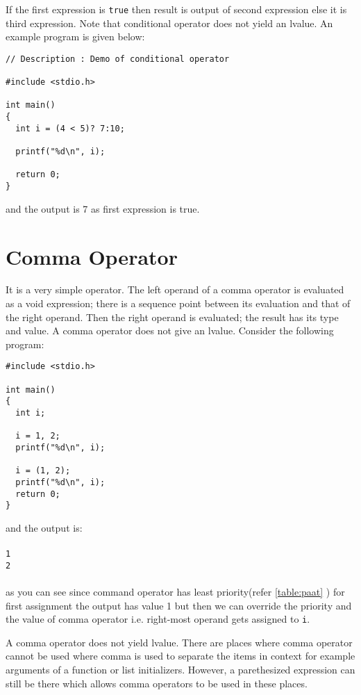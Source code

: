 If the first expression is \texttt{true} then result is output of second
expression else it is third expression. Note that conditional operator does not
yield an lvalue. An example program is given below:

\begin{verbatim}
// Description : Demo of conditional operator

#include <stdio.h>

int main()
{
  int i = (4 < 5)? 7:10;

  printf("%d\n", i);

  return 0;
}
\end{verbatim}
and the output is 7 as first expression is true.

\section{Comma Operator}
It is a very simple operator. The left operand of a comma operator is evaluated
as a void expression; there is a sequence point between its evaluation and that
of the right operand. Then the right operand is evaluated; the result has its
type and value. A comma operator does not give an lvalue. Consider the
following program:

\begin{verbatim}
#include <stdio.h>

int main()
{
  int i;

  i = 1, 2;
  printf("%d\n", i);

  i = (1, 2);
  printf("%d\n", i);
  return 0;
}
\end{verbatim}

and the output is:
\\\\\texttt{1\\
2\\\\}
as you can see since command operator has least priority(refer
\autoref{table:paat} ) for first assignment the output
has value 1 but then we can
override the priority and the value of comma operator i.e. right-most operand
gets assigned to \texttt{i}.

A comma operator does not yield lvalue. There are places where comma operator
cannot be used where comma is used to separate the items in context for example
arguments of a function or list initializers. However, a parethesized
expression can still be there which allows comma operators to be used in these
places.

